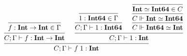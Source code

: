 \documentclass[12pt]{article}
\begin{document}
\pagestyle{empty}

\[
    \begin{prooftree}
        \infer0{f: \mathbf{Int} \to \mathbf{Int} \in \Gamma}
        \infer1{C; \Gamma \vdash f: \mathbf{Int} \to \mathbf{Int}}
        \infer0{1: \mathbf{Int64} \in \Gamma}
        \infer1{C; \Gamma \vdash 1: \mathbf{Int64}}
        \infer0{\mathbf{Int} \simeq \mathbf{Int64} \in C}
        \infer1{C \Vdash \mathbf{Int} \simeq \mathbf{Int64}}
        \infer1{C \Vdash \mathbf{Int64} \simeq \mathbf{Int}}
        \infer2{C; \Gamma \vdash 1: \mathbf{Int}}
        \infer2{C; \Gamma \vdash f\; 1: \mathbf{Int}}
    \end{prooftree}
\]
\end{document}
